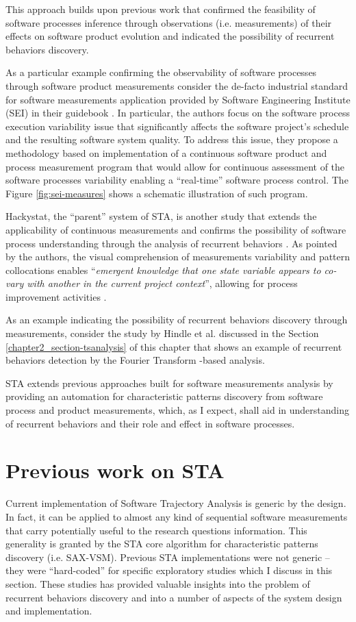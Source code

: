 This approach builds upon previous work that confirmed the feasibility of software processes inference through 
observations (i.e. measurements) of their effects on software product evolution and indicated the possibility of 
recurrent behaviors discovery. 

As a particular example confirming the observability of software processes through software product measurements 
consider the de-facto industrial standard for software measurements application provided by 
Software Engineering Institute (SEI) in their guidebook \cite{citeulike:10567306}. 
In particular, the authors focus on the software process execution variability issue that significantly 
affects the software project's schedule and the resulting software system quality. 
To address this issue, they propose a methodology based on implementation of a continuous software product 
and process measurement program that would allow for continuous assessment of the software processes 
variability enabling a ``real-time'' software process control. The Figure \ref{fig:sei-measures} shows a schematic 
illustration of such program.

Hackystat, the ``parent'' system of STA, is another study that extends the applicability of continuous 
measurements and confirms the possibility of software process understanding through the analysis of recurrent 
behaviors \cite{citeulike:557296}. 
As pointed by the authors, the visual comprehension of measurements variability and pattern collocations enables 
``\textit{emergent knowledge that one state variable appears to co-vary with another in the current project context}'',
allowing for process improvement activities \cite{citeulike:557296}. 

As an example indicating the possibility of recurrent behaviors discovery through measurements, consider the 
study by Hindle et al. \cite{citeulike:10377345} discussed in the Section \ref{chapter2_section-tsanalysis} of 
this chapter that shows an example of recurrent behaviors detection by the Fourier Transform -based analysis.

STA extends previous approaches built for software measurements analysis by providing an automation for 
characteristic patterns discovery from software process and product measurements, which, as I expect, shall 
aid in understanding of recurrent behaviors and their role and effect in software processes.

\section{Previous work on STA}
Current implementation of Software Trajectory Analysis is generic by the design. In fact, it can be applied 
to almost any kind of sequential software measurements that carry potentially useful to the research 
questions information. 
This generality is granted by the STA core algorithm for characteristic patterns discovery (i.e. SAX-VSM). 
Previous STA implementations were not generic -- they were ``hard-coded'' for specific exploratory studies 
which I discuss in this section. These studies has provided valuable insights into the problem of recurrent 
behaviors discovery and into a number of aspects of the system design and implementation.

